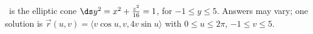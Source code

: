 {\surfaceS\ is the elliptic cone $\ds y^2= x^2+\frac{z^2}{16} = 1$, for $-1 \leq y \leq 5$.
}
{Answers may vary; one solution is $\vec r(u,v) = \langle v\cos u, v, 4v\sin u\rangle$ with $0\leq u\leq 2\pi$, $-1\leq v\leq 5$.
}
